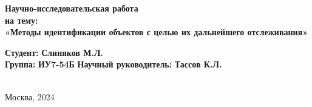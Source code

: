 \begin{titlepage}
    \begin{center}
        \Large\textbf{Научно-исследовательская работа} \\
        \vspace{0.5cm}
        \Large\textbf{на тему:} \\
        \LARGE\textbf{«Методы идентификации объектов с целью их дальнейшего отслеживания»}
    \end{center}
    
    \vspace{2cm}
    
    \hfill \noindent\textbf{Студент:} \textbf{Слиняков М.Л.} 
    \noindent\hspace{3cm} \underline{\hspace{6cm}} \\ %
    \hfill \noindent\textbf{Группа:} \textbf{ИУ7-54Б} 
    \hfill \noindent\textbf{Научный руководитель:} \textbf{Тассов К.Л.} \\
    \noindent\hspace{3cm} \underline{\hspace{6cm}} \\ %
    
    \begin{center}
        \vfill
        Москва, 2024
    \end{center}
    \restoregeometry
\end{titlepage}
